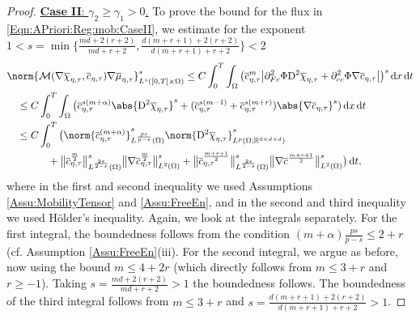 \documentclass[a4paper,12pt]{article}
\newcommand{\R}{\mathbb{R}}
\newcommand{\calM}{\mathcal{M}}
\newcommand{\pl}{\partial}
\newcommand{\dx}{\mathrm{\,d}x}
\newcommand{\dt}{\mathrm{\,d}t}
\newcommand{\chibar}{\overline{\chi}}
\newcommand{\mubar}{\overline{\mu}}
\newcommand{\cbar}{\overline{c}}
\newcommand{\rmD}{\mathrm{D}}
\theoremstyle{plain}
\theoremstyle{definition}
\numberwithin{equation}{section}
\begin{document}
\begin{proof}
    \underline{\textbf{Case II}: $\gamma_2\geq\gamma_1>0$.} To prove the bound for the flux in 
   \eqref{Eqn:APriori:Reg:mob:CaseII}, we estimate for the exponent $1<s=\min\{\frac{md+2(r+2)}{md+r+2},\frac{d(m+r+1)+2(r+2)}{d(m+r+1)+r+2}\}<2$
\begin{align*}
    &\norm{\calM(\nabla\chibar_{\eta,\tau},\cbar_{\eta,\tau})\nabla\mubar_{\eta,\tau}}_{L^s([0,T]\times\Omega)}^s 
	\leq C\int_0^T\int_\Omega \big(\cbar^m_{\eta,\tau}\big|\pl_{Fc}^2\Phi \rmD^2\chibar_{\eta,\tau} 
	+ \pl_{cc}^2\Phi\nabla \cbar_{\eta,\tau}\big|\big)^s\dx\dt\\
    &\quad\leq C\int_0^T\int_\Omega \big(\cbar_{\eta,\tau}^{s(m+\alpha)}\abs{\rmD^2\chibar_{\eta,\tau}}^s + (\cbar_{\eta,\tau}^{s(m-1)}+\cbar_{\eta,\tau}^{s(m+r)})\abs{\nabla \cbar_{\eta,\tau}}^s)\dx\dt\\  
    &\quad\leq C\int_0^T\big(\norm{\cbar^{(m+\alpha)}_{\eta,\tau}}^s_{L^{\frac{ps}{p-s}}(\Omega)}\norm{\rmD^2\chibar_{\eta,\tau}}^s_{L^p(\Omega;\R^{d\times d\times d})} \\
    &\qquad\qquad + \big\|{\cbar^{\frac{m}{2}}_{\eta,\tau}}\big\|^s_{L^\frac{2s}{2-s}(\Omega)}\big\|{\nabla \cbar_{\eta,\tau}^{\frac{m}{2}}}\big\|^s_{L^2(\Omega)} + \big\|{\cbar^{\frac{m+r+1}{2}}_{\eta,\tau}}\big\|^s_{L^\frac{2s}{2-s}(\Omega)}\big\|{\nabla \cbar^{\frac{m+r+1}{2}}}\big\|^s_{L^2(\Omega)}\big)\dt,
\end{align*}
where in the first and second inequality we used Assumptions \ref{Assu:MobilityTensor} and \ref{Assu:FreeEn}, and in the second and third inequality we used H\"older's inequality. Again, we look at the integrals separately. 
For the first integral, the boundedness follows from the condition $(m+\alpha)\frac{ps}{p-s}\leq 2+r$ (cf. Assumption \ref{Assu:FreeEn}(iii).
For the second integral, we argue as before, now using the bound $m\leq 4+2r$ (which directly follows from $m\leq 3+r$ and $r\geq -1$). Taking $s=\frac{md+2(r+2)}{md+r+2}>1$ the boundedness follows. The boundedness of the third integral follows from $m\leq 3+r$ and $s=\frac{d(m+r+1)+2(r+2)}{d(m+r+1)+r+2}>1$.



\end{proof}
\end{document}
